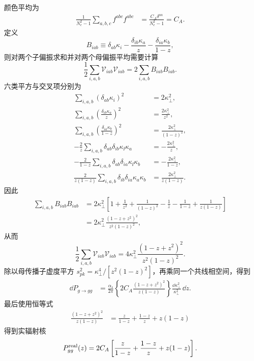 \begin{derivation}[最低阶部分子分裂核]
颜色平均为
\begin{align*}
 \frac1{N_c^2-1}\sum_{a,b,c}f^{abc}f^{abc}
 &=\frac{C_A\delta^{aa}}{N_c^2-1}
 =C_A.
\end{align*}
定义
\begin{equation*}
 B_{iab}
 \equiv
 \delta_{ab}\kappa_i
 -\frac{\delta_{ib}\kappa_a}{z}
 -\frac{\delta_{ia}\kappa_b}{1-z},
\end{equation*}
则对两个子偏振求和并对两个母偏振平均需要计算
\begin{equation*}
 \frac12\sum_{i,a,b}\mathcal V_{iab}\mathcal V_{iab}
 =2\sum_{i,a,b}B_{iab}B_{iab}.
\end{equation*}
六类平方与交叉项分别为
\begin{align*}
 \sum_{i,a,b}(\delta_{ab}\kappa_i)^2
 &=2\kappa_\perp^2,\\
 \sum_{i,a,b}\left(\frac{\delta_{ib}\kappa_a}{z}\right)^2
 &=\frac{2\kappa_\perp^2}{z^2},\\
 \sum_{i,a,b}\left(\frac{\delta_{ia}\kappa_b}{1-z}\right)^2
 &=\frac{2\kappa_\perp^2}{(1-z)^2},\\
 -\frac{2}{z}
 \sum_{i,a,b}\delta_{ab}\delta_{ib}\kappa_\ii\kappa_a
 &=-\frac{2\kappa_\perp^2}{z},\\
 -\frac{2}{1-z}
 \sum_{i,a,b}\delta_{ab}\delta_{ia}\kappa_\ii\kappa_b
 &=-\frac{2\kappa_\perp^2}{1-z},\\
 \frac{2}{z(1-z)}
 \sum_{i,a,b}\delta_{ib}\delta_{ia}\kappa_a\kappa_b
 &=\frac{2\kappa_\perp^2}{z(1-z)}.
\end{align*}
因此
\begin{align*}
 \sum_{i,a,b}B_{iab}B_{iab}
 &=2\kappa_\perp^2
 \left[
 1+\frac1{z^2}+\frac1{(1-z)^2}
 -\frac1z-\frac1{1-z}+\frac1{z(1-z)}
 \right]\\
 &=2\kappa_\perp^2
 \frac{(1-z+z^2)^2}{z^2(1-z)^2},
\end{align*}
从而
\begin{equation*}
 \frac12\sum_{i,a,b}\mathcal V_{iab}\mathcal V_{iab}
 =4\kappa_\perp^2
 \frac{(1-z+z^2)^2}{z^2(1-z)^2}.
\end{equation*}
除以母传播子虚度平方 $s_{pk}^2=\kappa_\perp^4/[z^2(1-z)^2]$，再乘同一个共线相空间，得到
\begin{align*}
 \dd P_{g\to gg}
 &=\frac{\alpha_s}{2\pi}
 \left\{2C_A
 \frac{(1-z+z^2)^2}{z(1-z)}\right\}
 \frac{\dd\kappa_\perp^2}{\kappa_\perp^2}\,\dd z.
\end{align*}
最后使用恒等式
\begin{align*}
 \frac{(1-z+z^2)^2}{z(1-z)}
 &=\frac{z}{1-z}+\frac{1-z}{z}+z(1-z)
\end{align*}
得到实辐射核
\begin{equation*}
 P_{gg}^{\rm real}(z)
 =2C_A\left[
 \frac{z}{1-z}+\frac{1-z}{z}+z(1-z)
 \right].
\end{equation*}


\end{derivation}
